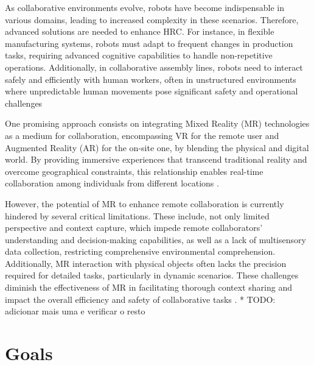 As collaborative environments evolve, robots have become indispensable in various domains, leading to increased complexity in these scenarios. Therefore, advanced solutions are needed to enhance \ac{HRC}. For instance, in flexible manufacturing systems, robots must adapt to frequent changes in production tasks, requiring advanced cognitive capabilities to handle non-repetitive operations. Additionally, in collaborative assembly lines, robots need to interact safely and efficiently with human workers, often in unstructured environments where unpredictable human movements pose significant safety and operational challenges \cite{Ogenyi2021, Aaltonen2019, doi:10.1177/0018720814565188}

One promising approach consists on integrating Mixed Reality (\ac{MR}) technologies as a medium for collaboration, encompassing \ac{VR} for the remote user and Augmented Reality (\ac{AR}) for the on-site one, by blending the physical and digital world. By providing immersive experiences that transcend traditional reality and overcome geographical constraints, this relationship enables real-time collaboration among individuals from different locations \cite{whatismixedreality, Mayer2023}.

However, the potential of \ac{MR} to enhance remote collaboration is currently hindered by several critical limitations. These include, not only limited perspective and context capture, which impede remote collaborators' understanding and decision-making capabilities, as well as a lack of multisensory data collection, restricting comprehensive environmental comprehension. 
Additionally, \ac{MR} interaction with physical objects often lacks the precision required for detailed tasks, particularly in dynamic scenarios. These challenges diminish the effectiveness of \ac{MR} in facilitating thorough context sharing and impact the overall efficiency and safety of 
collaborative tasks \cite{doi:10.5772/5664 }.
* TODO:  adicionar mais uma e verificar o resto

\FloatBarrier

\section{Goals}
\label{section:Goals}
% 

